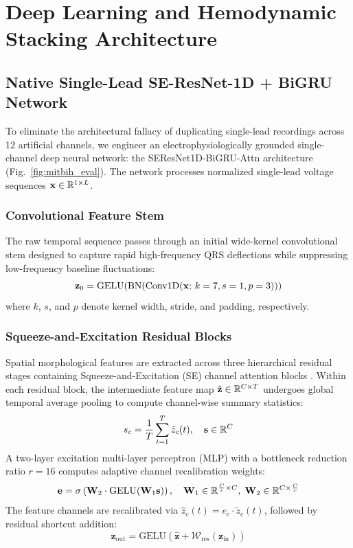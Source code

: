 \section{Deep Learning and Hemodynamic Stacking Architecture}
\label{sec:architecture}

\subsection{Native Single-Lead SE-ResNet-1D + BiGRU Network}
To eliminate the architectural fallacy of duplicating single-lead recordings across 12 artificial channels, we engineer an electrophysiologically grounded single-channel deep neural network: the \mbox{SEResNet1D-BiGRU-Attn} architecture (Fig.~\ref{fig:mitbih_eval}). The network processes normalized single-lead voltage sequences $\mathbf{x} \in \mathbb{R}^{1 \times L}$.

\subsubsection{Convolutional Feature Stem}
The raw temporal sequence passes through an initial wide-kernel convolutional stem designed to capture rapid high-frequency QRS deflections while suppressing low-frequency baseline fluctuations:
\begin{equation}
    \mathbf{z}_0 = \text{GELU}(\text{BN}(\text{Conv1D}(\mathbf{x}; \, k=7, s=1, p=3)))
\end{equation}
where $k$, $s$, and $p$ denote kernel width, stride, and padding, respectively.

\subsubsection{Squeeze-and-Excitation Residual Blocks}
Spatial morphological features are extracted across three hierarchical residual stages containing Squeeze-and-Excitation (SE) channel attention blocks \cite{Hu2018}. Within each residual block, the intermediate feature map $\tilde{\mathbf{z}} \in \mathbb{R}^{C \times T}$ undergoes global temporal average pooling to compute channel-wise summary statistics:
\begin{equation}
    s_c = \frac{1}{T} \sum_{t=1}^{T} \tilde{z}_c(t), \quad \mathbf{s} \in \mathbb{R}^C
\end{equation}
A two-layer excitation multi-layer perceptron (MLP) with a bottleneck reduction ratio $r = 16$ computes adaptive channel recalibration weights:
\begin{equation}
    \mathbf{e} = \sigma\left( \mathbf{W}_2 \cdot \text{GELU}(\mathbf{W}_1 \mathbf{s}) \right), \quad \mathbf{W}_1 \in \mathbb{R}^{\frac{C}{r} \times C}, \; \mathbf{W}_2 \in \mathbb{R}^{C \times \frac{C}{r}}
\end{equation}
The feature channels are recalibrated via $\hat{z}_c(t) = e_c \cdot \tilde{z}_c(t)$, followed by residual shortcut addition:
\begin{equation}
    \mathbf{z}_{\text{out}} = \text{GELU}\left(\hat{\mathbf{z}} + \mathcal{W}_{\text{res}}(\mathbf{z}_{\text{in}})\right)
\end{equation}

